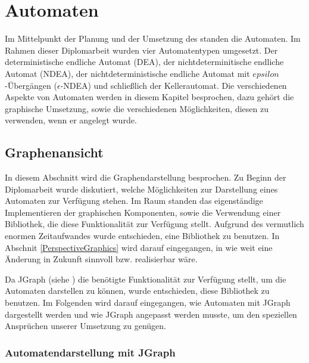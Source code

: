 



\chapter{Automaten}\label{Machines}

Im Mittelpunkt der Planung und der Umsetzung des \gtitools standen die Automaten.
Im Rahmen dieser Diplomarbeit wurden vier Automatentypen umgesetzt. Der
deterministische endliche Automat (DEA), der nichtdeterminitische endliche
Automat (NDEA), der nichtdeterministische endliche Automat mit
$epsilon$-Übergängen ($\epsilon$-NDEA) und schließlich der Kellerautomat. Die
verschiedenen Aspekte von Automaten werden in diesem Kapitel besprochen, dazu
gehört die graphische Umsetzung, sowie die verschiedenen Möglichkeiten, diesen zu
verwenden, wenn er angelegt wurde.\vspace{10pt}


\section{Graphenansicht}\label{Graph}

In diesem Abschnitt wird die Graphendarstellung besprochen. Zu Beginn der
Diplomarbeit wurde diskutiert, welche Möglichkeiten zur Darstellung eines
Automaten zur Verfügung stehen. Im Raum standen das eigenständige
Implementieren der graphischen Komponenten, sowie die Verwendung einer
Bibliothek, die diese Funktionalität zur Verfügung stellt. Aufgrund des
vermutlich enormen Zeitaufwandes wurde entschieden, eine Bibliothek zu benutzen.
In Abschnit \ref{PerspectiveGraphics} wird darauf eingegangen, in wie weit eine
Änderung in Zukunft sinnvoll bzw. realisierbar wäre.\vspace{10pt} 

Da JGraph (siehe \cite{jgraph}) die benötigte Funktionalität zur Verfügung
stellt, um die Automaten darstellen zu können, wurde entschieden, diese
Bibliothek zu benutzen. Im Folgenden wird darauf eingegangen, wie Automaten mit
JGraph dargestellt werden und wie JGraph angepasst werden musste, um den
speziellen Ansprüchen unserer Umsetzung zu genügen.\vspace{10pt}


\subsection{Automatendarstellung mit JGraph}\label{GraphJGraph}

